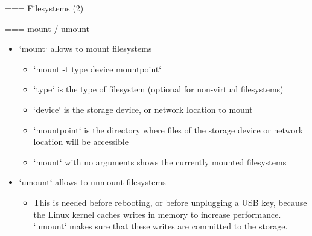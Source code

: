=== Filesystems (2)


=== mount / umount
  \begin{itemize}
  \item `mount` allows to mount filesystems
    \begin{itemize}
    \item `mount -t type device mountpoint`
    \item `type` is the type of filesystem (optional for
	non-virtual filesystems)
    \item `device` is the storage device, or network location to
      mount
    \item `mountpoint` is the directory where files of the
      storage device or network location will be accessible
    \item `mount` with no arguments shows the currently mounted
      filesystems
    \end{itemize}
  \item `umount` allows to unmount filesystems
    \begin{itemize}
    \item This is needed before rebooting, or before unplugging a USB
      key, because the Linux kernel caches writes in memory to
      increase performance. `umount` makes sure that these writes are
      committed to the storage.
    \end{itemize}
  \end{itemize}


